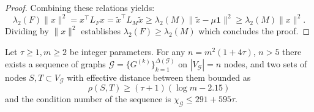 \documentclass[a4paper,USenglish,cleveref, autoref, thm-restate]{lipics-v2021}
\newcommand{\cG}{{\mathcal G}}
\begin{document}
\begin{proof}
Combining these relations yields:
\begin{equation}
    \lambda_2(F)\|x\|^2 = x^\top L_F x = \tilde{x}^\top L_M \tilde{x} \geq \lambda_2(M) \|\tilde{x} - \mu\mathbf{1}\|^2 \geq \lambda_2(M)\|x\|^2.
\end{equation}
Dividing by $\|x\|^2$ establishes $\lambda_2(F) \geq \lambda_2(M)$ which concludes the proof.
\end{proof}



\begin{lemma}\label{lem:distance}
Let $\tau \geq 1, m \geq 2$ be integer parameters. 
For any $n = m^2(1 + 4\tau)$, $n > 5$ there exists a sequence of graphs $\cG = \{G^{(k)}\}_{k=1}^{\Delta(\cG)}$ on $|V_\cG| = n$ nodes, and two sets of nodes $S, T \subset V_\cG$  with effective distance between them bounded as
\begin{equation}
    \rho\left(S, T\right) \geq (\tau+1)(\log m - 2.15)
\end{equation}
and the condition number of the sequence is $\chi_\cG \le 291 + 595 \tau$.
\end{lemma}
\end{document}
